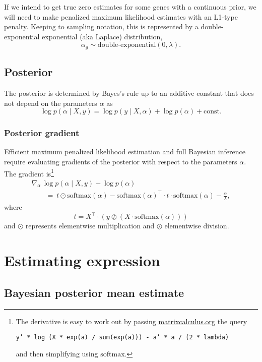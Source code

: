 \documentclass[11pt]{article}
\begin{document}
If we intend to get true zero estimates for some genes with a
continuous prior, we will need to make penalized maximum likelihood
estimates with an L1-type penalty.  Keeping to sampling notation, this
is represented by a double-exponential exponential (aka Laplace)
distribution,
\[
  \alpha_g \sim \textrm{double-exponential}(0, \lambda).
\]

\subsection{Posterior}

The posterior is determined by Bayes's rule up to an additive constant
that does not depend on the parameters $\alpha$ as
\[
  \log p(\alpha \mid X, y) = \log p(y \mid X, \alpha) + \log p(\alpha) +
  \textrm{const.}
  \]

\subsubsection{Posterior gradient}

Efficient maximum penalized likelihood estimation and full Bayesian inference
require evaluating gradients of the posterior with respect to the parameters
$\alpha$.  The gradient is\footnote{The derivative is easy to work out
  by passing \url{matrixcalculus.org} the query
  \begin{center}\texttt{y' * log
(X * exp(a) / sum(exp(a))) - a' * a / (2 * lambda)}\end{center}
and then simplifying using $\textrm{softmax}$.}
%
\[
  \begin{array}{l}
  \nabla\!_{\alpha} \, \log p(\alpha \mid X, y) + \log p(\alpha)
  \\[4pt]
  \qquad = \
    t \odot \textrm{softmax}(\alpha)
    - \textrm{softmax}(\alpha)^{\top}\! \cdot t \cdot \textrm{softmax}(\alpha)
    - \frac{\displaystyle \alpha}{\displaystyle \lambda},
\end{array}
\]
where
\[
  t = X^{\top}\! \cdot (y \oslash (X \cdot \textrm{softmax}(\alpha)))
\]
and $\odot$ represents elementwise multiplication and $\oslash$
elementwise division.

\section{Estimating expression}

\subsection{Bayesian posterior mean estimate}
\end{document}
